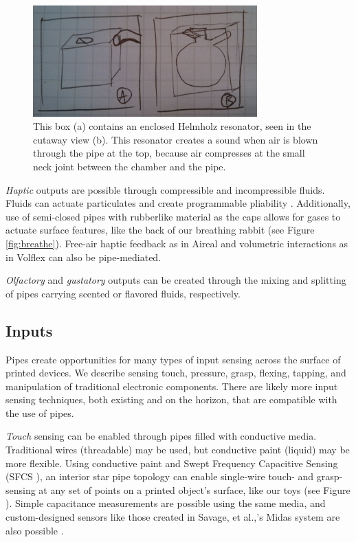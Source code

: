 \begin{figure}[h]
\centering
    \includegraphics[width=3.4in]{figures/placeholder/helmholz.jpg}
\caption{This box (a) contains an enclosed Helmholz resonator, seen in the cutaway view (b).  This resonator creates a sound when air is blown through the pipe at the top, because air compresses at the small neck joint between the chamber and the pipe.  }
\label{fig:ocarina}
\end{figure}

\emph{Haptic} outputs are possible through compressible and incompressible fluids.  Fluids can actuate particulates and create programmable pliability \cite{Follmer-jamming}.  Additionally, use of semi-closed pipes with rubberlike material as the caps allows for gases to actuate surface features, like the back of our breathing rabbit (see Figure \ref{fig:breathe}).  Free-air haptic feedback as in Aireal \cite{Sodhi-aireal} and volumetric interactions as in Volflex \cite{Iwata-volflex} can also be pipe-mediated.

\emph{Olfactory} and \emph{gustatory} outputs can be created through the mixing and splitting of pipes carrying scented or flavored fluids, respectively.

\subsection{Inputs}

Pipes create opportunities for many types of input sensing across the surface of printed devices.  We describe sensing touch, pressure, grasp, flexing, tapping, and manipulation of traditional electronic components.  There are likely more input sensing techniques, both existing and on the horizon, that are compatible with the use of pipes.

\emph{Touch} sensing can be enabled through pipes filled with conductive media.  Traditional wires (threadable) may be used, but conductive paint (liquid) may be more flexible.  Using conductive paint and Swept Frequency Capacitive Sensing (SFCS \cite{Sato-touche}), an interior star pipe topology can enable single-wire touch- and grasp-sensing at any set of points on a printed object's surface, like our toys (see Figure \cite{fig:toys}).  Simple capacitance measurements are possible using the same media, and custom-designed sensors like those created in Savage, et al.,'s Midas system are also possible \cite{Savage-midas}.

